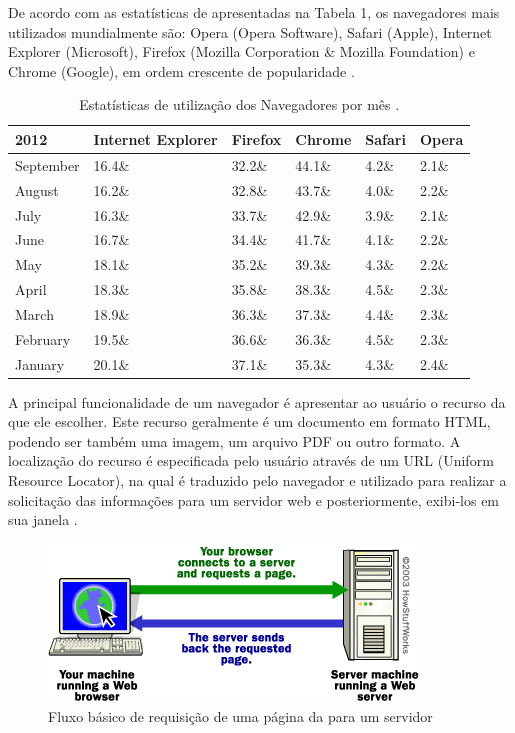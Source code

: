 \documentclass[espaco=simples,appendix=Name]{abnt}
\begin{document}
\begin{description}
De acordo com as estatísticas de  apresentadas na Tabela 1, os navegadores mais utilizados mundialmente são: Opera (Opera Software), Safari (Apple), Internet Explorer (Microsoft), Firefox (Mozilla Corporation \& Mozilla Foundation) e Chrome (Google), em ordem crescente de popularidade \cite{W3schools}.

\begin{table}[ht]
	\centering
	\caption{Estatísticas de utilização dos Navegadores por mês \cite{W3schools}.
	\label{tbl:padc}}{
		\vspace{0.3cm}
		\begin{tabular}{|l|l|l|l|l|l|}
	    	\hline
			\textbf{2012} & \textbf{Internet Explorer} & \textbf{Firefox} &\textbf{Chrome} & \textbf{Safari} & \textbf{Opera} \\
			\hline
			September	& 16.4\& & 32.2\& & 44.1\& & 4.2\& & 2.1\& \\
			\hline
			August		& 16.2\& & 32.8\& & 43.7\& & 4.0\& & 2.2\& \\
			\hline
			July		& 16.3\& & 33.7\& & 42.9\& & 3.9\& & 2.1\& \\
			\hline
			June		& 16.7\& & 34.4\& & 41.7\& & 4.1\& & 2.2\& \\
			\hline
			May			& 18.1\& & 35.2\& & 39.3\& & 4.3\& & 2.2\& \\
			\hline
			April		& 18.3\& & 35.8\& &	38.3\& & 4.5\& & 2.3\& \\
			\hline
			March		& 18.9\& & 36.3\& &	37.3\& & 4.4\& & 2.3\& \\
			\hline
			February	& 19.5\& & 36.6\& &	36.3\& & 4.5\& & 2.3\& \\
			\hline
			January		& 20.1\& & 37.1\& &	35.3\& & 4.3\& & 2.4\& \\
			\hline
		\end{tabular}
		}
\end{table}
A principal funcionalidade de um navegador é apresentar ao usuário o recurso da  que ele escolher. Este  recurso geralmente é um documento em formato HTML, podendo ser também uma imagem, um arquivo PDF ou outro formato. A localização do recurso é especificada pelo usuário através de um URL (Uniform Resource Locator), na qual é traduzido pelo navegador e utilizado para realizar a solicitação das informações para um servidor web e posteriormente, exibi-los em sua janela \cite{ArchitectureWebBrowsers}.

\begin{figure}[h]
  \centering
    \includegraphics[scale=1]{web_basic.png}
  \caption{Fluxo básico de requisição de uma página da  para um servidor \protect\cite{BrowserStats}}
\end{figure}
 

\end{description}
\end{document}
